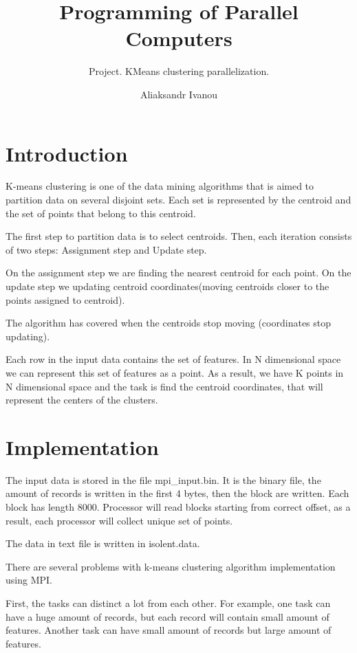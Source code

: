 \documentclass[11pt, a4paper]{scrartcl}
\title{Programming of Parallel Computers}
\subtitle{Project. KMeans clustering parallelization.}
\author{Aliaksandr Ivanou \\ \email{Aliaksandr.Ivanou.1364@student.uu.se}}
\begin{document}
\maketitle

\section{Introduction}

K-means clustering is one of the data mining algorithms that is aimed to partition data on several disjoint sets. Each set is represented by the centroid and the set of points that belong to this centroid. 

The first step to partition data is to select centroids. 
Then, each iteration consists of two steps: Assignment step and Update step.

On the assignment step we are finding the nearest centroid for each point.
On the update step we updating centroid coordinates(moving centroids closer to the points assigned to centroid). 

The algorithm has covered when the centroids stop moving (coordinates stop updating).

Each row in the input data contains the set of features. In N dimensional space we can represent this set of features as a point. As a result, we have K points in N dimensional space and the task is find the centroid coordinates, that will represent the centers of the clusters.

\section{Implementation}

The input data is stored in the file mpi\_input.bin. It is the binary file, the amount of records is written in the first 4 bytes, then the block are written. Each block has length 8000. Processor will read blocks starting from correct offset, as a result, each processor will collect unique set of points.

The data in text file is written in isolent.data.

There are several problems with k-means clustering algorithm implementation using MPI.

First, the tasks can distinct a lot from each other. For example, one task can have a huge amount of records, but each record will contain small amount of features. Another task can have small amount of records but large amount of features. 
\end{document}
